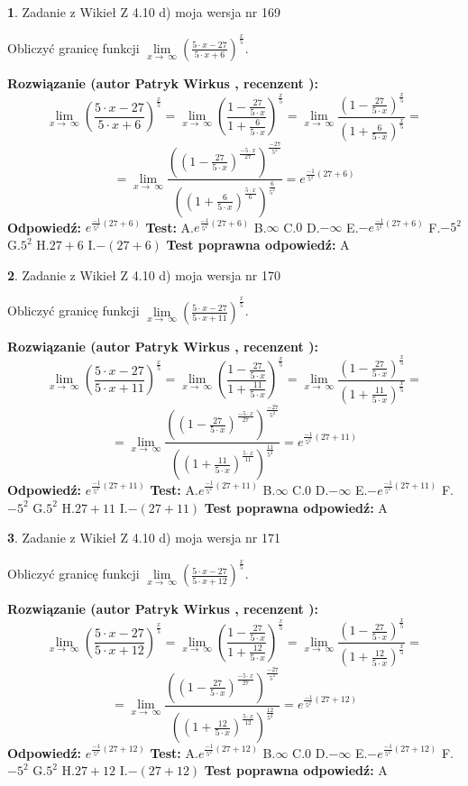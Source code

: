 \documentclass[12pt, a4paper]{article}
\theoremstyle{definition} %
\newtheorem{zad}{}
\newcommand{\zadStart}[1]{\begin{zad}#1\newline}
\newcommand{\zadStop}{\end{zad}}
\newcommand{\rozwStart}[2]{\noindent \textbf{Rozwiązanie (autor #1 , recenzent #2): }\newline}
\newcommand{\rozwStop}{\newline}
\newcommand{\odpStart}{\noindent \textbf{Odpowiedź:}\newline}
\newcommand{\odpStop}{\newline}
\newcommand{\testStart}{\noindent \textbf{Test:}\newline}
\newcommand{\testStop}{\newline}
\newcommand{\kluczStart}{\noindent \textbf{Test poprawna odpowiedź:}\newline}
\newcommand{\kluczStop}{\newline}
\begin{document}
\zadStart{Zadanie z Wikieł Z 4.10 d) moja wersja nr 169}


Obliczyć granicę funkcji  $\lim\limits_{x\to\ \infty}(\frac{5\cdot x-27}{5\cdot x+6})^{\frac{x}{5}}$.
\zadStop
\rozwStart{Patryk Wirkus}{}
$$\lim\limits_{x\to\ \infty}(\frac{5\cdot x-27}{5\cdot x+6})^{\frac{x}{5}} = \lim\limits_{x\to\ \infty}(\frac{1-\frac{27}{5\cdot x}}{1+\frac{6}{5\cdot x}})^{\frac{x}{5}}=\lim\limits_{x\to\ \infty}\frac{(1-\frac{27}{5\cdot x})^{\frac{x}{5}}}{(1+\frac{6}{5\cdot x})^{\frac{x}{5}}}=$$
$$=\lim\limits_{x\to\ \infty}\frac{((1-\frac{27}{5\cdot x})^{\frac{-5\cdot x}{27}})^{\frac{-27}{5^{2}}}}{((1+\frac{6}{5\cdot x})^{\frac{5\cdot x}{6}})^{\frac{6}{5^{2}}}}=e^{\frac{-1}{5^{2}}(27+6)}$$
\rozwStop
\odpStart
$e^{\frac{-1}{5^{2}}(27+6)}$
\odpStop
\testStart
A.$e^{\frac{-1}{5^{2}}(27+6)}$ B.$\infty$ C.$0$ D.$-\infty$ E.$-e^{\frac{-1}{5^{2}}(27+6)}$
F.$-5^{2}$ G.$5^{2}$
H.$27+6$
I.$-(27+6)$
\testStop
\kluczStart
A
\kluczStop



\zadStart{Zadanie z Wikieł Z 4.10 d) moja wersja nr 170}


Obliczyć granicę funkcji  $\lim\limits_{x\to\ \infty}(\frac{5\cdot x-27}{5\cdot x+11})^{\frac{x}{5}}$.
\zadStop
\rozwStart{Patryk Wirkus}{}
$$\lim\limits_{x\to\ \infty}(\frac{5\cdot x-27}{5\cdot x+11})^{\frac{x}{5}} = \lim\limits_{x\to\ \infty}(\frac{1-\frac{27}{5\cdot x}}{1+\frac{11}{5\cdot x}})^{\frac{x}{5}}=\lim\limits_{x\to\ \infty}\frac{(1-\frac{27}{5\cdot x})^{\frac{x}{5}}}{(1+\frac{11}{5\cdot x})^{\frac{x}{5}}}=$$
$$=\lim\limits_{x\to\ \infty}\frac{((1-\frac{27}{5\cdot x})^{\frac{-5\cdot x}{27}})^{\frac{-27}{5^{2}}}}{((1+\frac{11}{5\cdot x})^{\frac{5\cdot x}{11}})^{\frac{11}{5^{2}}}}=e^{\frac{-1}{5^{2}}(27+11)}$$
\rozwStop
\odpStart
$e^{\frac{-1}{5^{2}}(27+11)}$
\odpStop
\testStart
A.$e^{\frac{-1}{5^{2}}(27+11)}$ B.$\infty$ C.$0$ D.$-\infty$ E.$-e^{\frac{-1}{5^{2}}(27+11)}$
F.$-5^{2}$ G.$5^{2}$
H.$27+11$
I.$-(27+11)$
\testStop
\kluczStart
A
\kluczStop



\zadStart{Zadanie z Wikieł Z 4.10 d) moja wersja nr 171}


Obliczyć granicę funkcji  $\lim\limits_{x\to\ \infty}(\frac{5\cdot x-27}{5\cdot x+12})^{\frac{x}{5}}$.
\zadStop
\rozwStart{Patryk Wirkus}{}
$$\lim\limits_{x\to\ \infty}(\frac{5\cdot x-27}{5\cdot x+12})^{\frac{x}{5}} = \lim\limits_{x\to\ \infty}(\frac{1-\frac{27}{5\cdot x}}{1+\frac{12}{5\cdot x}})^{\frac{x}{5}}=\lim\limits_{x\to\ \infty}\frac{(1-\frac{27}{5\cdot x})^{\frac{x}{5}}}{(1+\frac{12}{5\cdot x})^{\frac{x}{5}}}=$$
$$=\lim\limits_{x\to\ \infty}\frac{((1-\frac{27}{5\cdot x})^{\frac{-5\cdot x}{27}})^{\frac{-27}{5^{2}}}}{((1+\frac{12}{5\cdot x})^{\frac{5\cdot x}{12}})^{\frac{12}{5^{2}}}}=e^{\frac{-1}{5^{2}}(27+12)}$$
\rozwStop
\odpStart
$e^{\frac{-1}{5^{2}}(27+12)}$
\odpStop
\testStart
A.$e^{\frac{-1}{5^{2}}(27+12)}$ B.$\infty$ C.$0$ D.$-\infty$ E.$-e^{\frac{-1}{5^{2}}(27+12)}$
F.$-5^{2}$ G.$5^{2}$
H.$27+12$
I.$-(27+12)$
\testStop
\kluczStart
A
\kluczStop
\end{document}
